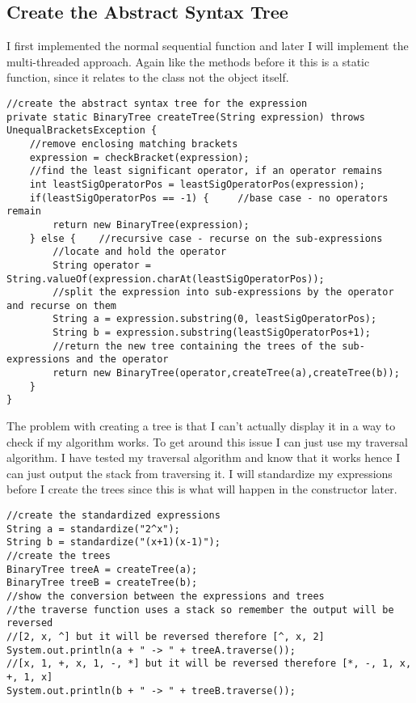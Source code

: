 \documentclass[../../../../../main.tex]{subfiles}
\begin{document}
\subsection{Create the Abstract Syntax Tree}
I first implemented the normal sequential function and later I will implement the multi-threaded approach. Again like the methods before it this is a static function, since it relates to the class not the object itself.
\begin{verbatim}
//create the abstract syntax tree for the expression
private static BinaryTree createTree(String expression) throws UnequalBracketsException {
	//remove enclosing matching brackets
	expression = checkBracket(expression);
	//find the least significant operator, if an operator remains
	int leastSigOperatorPos = leastSigOperatorPos(expression);
	if(leastSigOperatorPos == -1) {		//base case - no operators remain
		return new BinaryTree(expression);
	} else {	//recursive case - recurse on the sub-expressions
		//locate and hold the operator
		String operator = String.valueOf(expression.charAt(leastSigOperatorPos));
		//split the expression into sub-expressions by the operator and recurse on them
		String a = expression.substring(0, leastSigOperatorPos);
		String b = expression.substring(leastSigOperatorPos+1);
		//return the new tree containing the trees of the sub-expressions and the operator
		return new BinaryTree(operator,createTree(a),createTree(b));
	}
}
\end{verbatim}
The problem with creating a tree is that I can't actually display it in a way to check if my algorithm works. To get around this issue I can just use my traversal algorithm. I have tested my traversal algorithm and know that it works hence I can just output the stack from traversing it. I will standardize my expressions before I create the trees since this is what will happen in the constructor later.
\begin{verbatim}
//create the standardized expressions
String a = standardize("2^x");
String b = standardize("(x+1)(x-1)");
//create the trees
BinaryTree treeA = createTree(a);
BinaryTree treeB = createTree(b);
//show the conversion between the expressions and trees
//the traverse function uses a stack so remember the output will be reversed
//[2, x, ^] but it will be reversed therefore [^, x, 2]
System.out.println(a + " -> " + treeA.traverse());
//[x, 1, +, x, 1, -, *] but it will be reversed therefore [*, -, 1, x, +, 1, x]
System.out.println(b + " -> " + treeB.traverse());
\end{verbatim}
\end{document}
